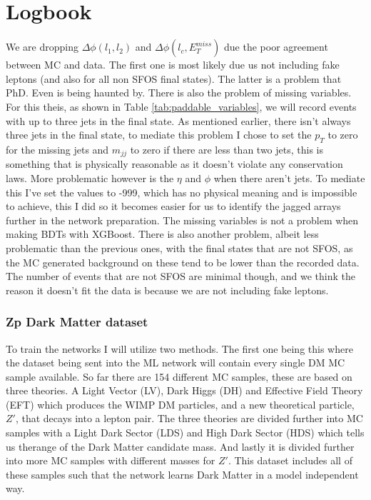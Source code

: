 \documentclass[14pt, a4paper]{book}
\begin{document}
\chapter*{Logbook}

We are dropping $\Delta\phi(l_1,l_2)$ and $\Delta\phi(l_c,E_T^{miss})$ due the poor agreement between MC and data. The first one is most likely due us not including fake leptons (and also for all non SFOS final states). The latter is a problem that PhD. Even is being haunted by. 
There is also the problem of missing variables. For this theis, as shown in Table \ref{tab:paddable_variables}, we will record events with up to three jets in the final state. As mentioned earlier, there isn't 
always three jets in the final state, to mediate this problem I chose to set the $p_T$ to zero for the missing jets and $m_{jj}$ to zero if there are less than two jets, this is something that is physically reasonable as it doesn't violate any conservation laws. 
More problematic however is the $\eta$ and $\phi$ when there aren't jets. To mediate this I've set the values to -999, which has no physical meaning and is impossible to achieve, this I did so it becomes easier for us to identify the jagged arrays further in the network preparation. 
The missing variables is not a problem when making BDTs with XGBoost. There is also another problem, albeit less problematic than the previous ones, with the final states that are not SFOS, as the MC generated background 
on these tend to be lower than the recorded data. The number of events that are not SFOS are minimal though, and we think the reason it doesn't fit the data is because we are not including fake leptons. 

\subsection*{Zp Dark Matter dataset}
To train the networks I will utilize two methods. The first one being this where the dataset being sent into the ML network will contain every single DM MC sample available. 
So far there are 154 different MC samples, these are based on three theories. A Light Vector (LV), Dark Higgs (DH) and Effective Field Theory (EFT) which produces the WIMP DM particles, and a new theoretical particle, $Z'$, 
that decays into a lepton pair. The three theories are divided further into MC samples with a Light Dark Sector (LDS) and High Dark Sector (HDS) which tells us therange of the Dark Matter candidate mass. 
And lastly it is divided further into more MC samples with different masses for $Z'$. This dataset includes all of these samples such that the network learns Dark Matter in a model independent way.
\end{document}
